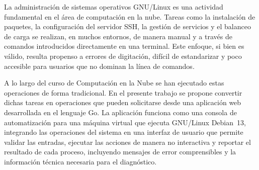 \documentclass[journal]{IEEEtran}
\begin{document}
La administración de sistemas operativos GNU/Linux es una actividad
fundamental en el área de computación en la nube. Tareas como la
instalación de paquetes, la configuración del servidor SSH, la gestión
de servicios y el balanceo de carga se realizan, en muchos entornos, de
manera manual y a través de comandos introducidos directamente en una
terminal. Este enfoque, si bien es válido, resulta propenso a errores de
digitación, difícil de estandarizar y poco accesible para usuarios que
no dominan la línea de comandos.

A lo largo del curso de Computación en la Nube se han ejecutado estas
operaciones de forma tradicional. En el presente trabajo se propone
convertir dichas tareas en operaciones que pueden solicitarse desde una
aplicación web desarrollada en el lenguaje Go. La aplicación funciona
como una consola de automatización para una máquina virtual que ejecuta
GNU/Linux Debian~13, integrando las operaciones del sistema en una
interfaz de usuario que permite validar las entradas, ejecutar las
acciones de manera no interactiva y reportar el resultado de cada
proceso, incluyendo mensajes de error comprensibles y la información
técnica necesaria para el diagnóstico.







\printbibliography
\end{document}
